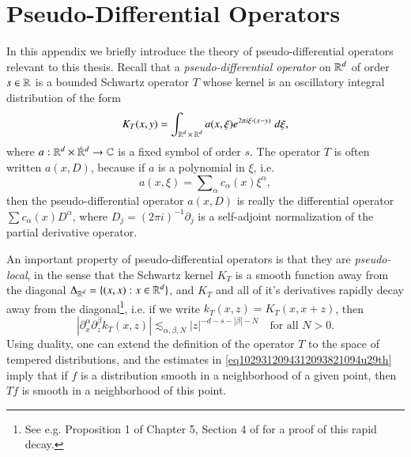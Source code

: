 \chapter{Pseudo-Differential Operators} \label{appendixpsueiodjaweiodj}

In this appendix we briefly introduce the theory of pseudo-differential operators relevant to this thesis. Recall that a \emph{pseudo-differential operator} on $\operatorname{\mathbb{R}}^d$ of order $s \in \operatorname{\mathbb{R}}$ is a bounded Schwartz operator $T$ whose kernel is an oscillatory integral distribution of the form
%
\begin{equation}
    K_T(x,y) = \int_{\operatorname{\mathbb{R}}^d \times \operatorname{\mathbb{R}}^d} a(x,\xi) e^{2 \pi i \xi \cdot (x - y)}\; d\xi,
\end{equation}
%
where $a: {\RR^d} \times {\dot{\RR}{\vphantom{\RR}}^d} \to \CC$ is a fixed symbol of order $s$. The operator $T$ is often written $a(x,D)$, because if $a$ is a polynomial in $\xi$, i.e.
%
\begin{equation}
    a(x,\xi) = \sum\nolimits_\alpha c_\alpha(x) \xi^\alpha,
\end{equation}
%
then the pseudo-differential operator $a(x,D)$ is really the differential operator $\sum c_\alpha(x) D^\alpha$, where $D_j = (2\pi i)^{-1} \partial_j$ is a self-adjoint normalization of the partial derivative operator.

An important property of pseudo-differential operators is that they are \emph{pseudo-local}, in the sense that the Schwartz kernel $K_T$ is a smooth function away from the diagonal $\Delta_{\operatorname{\mathbb{R}}^d} = \{ (x,x): x \in \operatorname{\mathbb{R}}^d \}$, and $K_T$ and all of it's derivatives rapidly decay away from the diagonal\footnote{See e.g. Proposition 1 of Chapter 5, Section 4 of \cite{BigStein} for a proof of this rapid decay.}, i.e. if we write $k_T(x,z) = K_T(x,x+z)$, then
%
\begin{equation} \label{eq1029312094312093821094u29th}
    | \partial_x^\alpha \partial_z^\beta k_T(x,z)| \lesssim_{\alpha,\beta,N} |z|^{-d-s-|\beta| - N} \quad\text{for all $N > 0$}.
\end{equation}
%
Using duality, one can extend the definition of the operator $T$ to the space of tempered distributions, and the estimates in \eqref{eq1029312094312093821094u29th} imply that if $f$ is a distribution smooth in a neighborhood of a given point, then $Tf$ is smooth in a neighborhood of this point.
%
%

